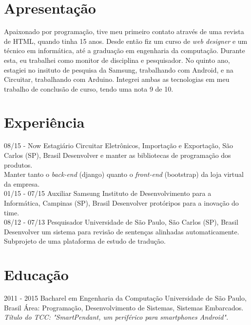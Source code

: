 \documentclass[]{friggeri-cv}
\begin{document}
\section{Apresentação}
  Apaixonado por programação, tive meu primeiro contato através de uma revista de HTML,
  quando tinha 15 anos. Desde então fiz um curso de \emph{web designer} e um técnico em
  informática, até a graduação em engenharia da computação. Durante esta, eu trabalhei
  como monitor de disciplina e pesquisador. No quinto ano, estagiei no insituto de
  pesquisa da Samsung, trabalhando com Android, e na Circuitar, trabalhando com Arduino. Integrei ambas as tecnologias em meu trabalho de conclusão de curso, tendo uma nota
  9 de 10.

\section{Experiência}
\begin{entrylist}
  \entry
    {08/15 - Now}
    {Estagiário}
    {Circuitar Eletrônicos, Importação e Exportação, São Carlos (SP), Brasil}
    {Desenvolver e manter as bibliotecas de programação dos produtos.\\
     Manter tanto o \emph{back-end} (django) quanto o \emph{front-end} (bootstrap)
     da loja virtual da empresa.\\}
  \entry
    {01/15 - 07/15}
    {Auxiliar}
    {Samsung Instituto de Desenvolvimento para a Informática, Campinas (SP), Brasil}
    {Desenvolver protóripos para a inovação do time.\\}
    \entry
    {08/12 - 07/13}
    {Pesquisador}
    {Universidade de São Paulo, São Carlos (SP), Brasil}
    {Desenvolver um sistema para revisão de sentenças alinhadas automaticamente.\\
     Subprojeto de uma plataforma de estudo de tradução.\\}
\end{entrylist}

\section{Educação}
\begin{entrylist}
  \entry
    {2011 - 2015}
    {Bacharel em Engenharia da Computação}
    {Universidade de São Paulo, Brasil}
    {Área: Programação, Desenvolvimento de Sistemas, Sistemas Embarcados.\\
    \emph{Título do TCC: "SmartPendant, um periférico para smartphones Android".}\\}
\end{entrylist}
\end{document}
